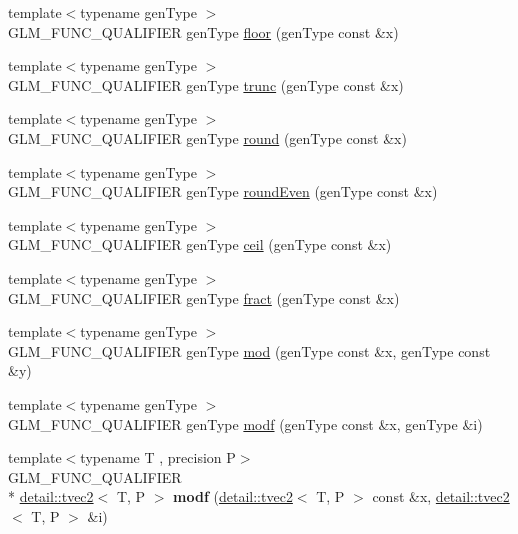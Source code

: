 \begin{DoxyCompactItemize}
\item 
{\footnotesize template$<$typename gen\-Type $>$ }\\G\-L\-M\-\_\-\-F\-U\-N\-C\-\_\-\-Q\-U\-A\-L\-I\-F\-I\-E\-R gen\-Type \hyperlink{group__core__func__common_ga86350252cc9bf86421317460bbd1f21c}{floor} (gen\-Type const \&x)
\item 
{\footnotesize template$<$typename gen\-Type $>$ }\\G\-L\-M\-\_\-\-F\-U\-N\-C\-\_\-\-Q\-U\-A\-L\-I\-F\-I\-E\-R gen\-Type \hyperlink{group__core__func__common_gadb091aed51e45872f6dc841affa41c5c}{trunc} (gen\-Type const \&x)
\item 
{\footnotesize template$<$typename gen\-Type $>$ }\\G\-L\-M\-\_\-\-F\-U\-N\-C\-\_\-\-Q\-U\-A\-L\-I\-F\-I\-E\-R gen\-Type \hyperlink{group__core__func__common_ga75ebab3fe88a9c5c769135cf5a2649ef}{round} (gen\-Type const \&x)
\item 
{\footnotesize template$<$typename gen\-Type $>$ }\\G\-L\-M\-\_\-\-F\-U\-N\-C\-\_\-\-Q\-U\-A\-L\-I\-F\-I\-E\-R gen\-Type \hyperlink{group__core__func__common_ga6535952553479a4bbca7f1f12a011b17}{round\-Even} (gen\-Type const \&x)
\item 
{\footnotesize template$<$typename gen\-Type $>$ }\\G\-L\-M\-\_\-\-F\-U\-N\-C\-\_\-\-Q\-U\-A\-L\-I\-F\-I\-E\-R gen\-Type \hyperlink{group__core__func__common_gab81e02fff55c9391e28fa47e68c3c903}{ceil} (gen\-Type const \&x)
\item 
{\footnotesize template$<$typename gen\-Type $>$ }\\G\-L\-M\-\_\-\-F\-U\-N\-C\-\_\-\-Q\-U\-A\-L\-I\-F\-I\-E\-R gen\-Type \hyperlink{group__core__func__common_gad04ac2908d032d5518d5f6c8403dbc8b}{fract} (gen\-Type const \&x)
\item 
{\footnotesize template$<$typename gen\-Type $>$ }\\G\-L\-M\-\_\-\-F\-U\-N\-C\-\_\-\-Q\-U\-A\-L\-I\-F\-I\-E\-R gen\-Type \hyperlink{group__core__func__common_ga8cc8a75b05125fe1c30de43102ef42e1}{mod} (gen\-Type const \&x, gen\-Type const \&y)
\item 
{\footnotesize template$<$typename gen\-Type $>$ }\\G\-L\-M\-\_\-\-F\-U\-N\-C\-\_\-\-Q\-U\-A\-L\-I\-F\-I\-E\-R gen\-Type \hyperlink{group__core__func__common_gae47da02eb07d660201c09a0df7298a05}{modf} (gen\-Type const \&x, gen\-Type \&i)
\item 
\hypertarget{namespaceglm_a853da29134180c976324f3db6ae57efd}{{\footnotesize template$<$typename T , precision P$>$ }\\G\-L\-M\-\_\-\-F\-U\-N\-C\-\_\-\-Q\-U\-A\-L\-I\-F\-I\-E\-R \\*
\hyperlink{structglm_1_1detail_1_1tvec2}{detail\-::tvec2}$<$ T, P $>$ {\bfseries modf} (\hyperlink{structglm_1_1detail_1_1tvec2}{detail\-::tvec2}$<$ T, P $>$ const \&x, \hyperlink{structglm_1_1detail_1_1tvec2}{detail\-::tvec2}$<$ T, P $>$ \&i)}\label{namespaceglm_a853da29134180c976324f3db6ae57efd}


\end{DoxyCompactItemize}
